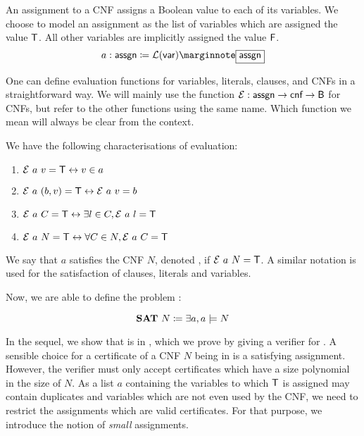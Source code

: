 An assignment to a CNF assigns a Boolean value to each of its variables. We choose to model an assignment as the list of variables which are assigned the value $\mathsf{T}$. All other variables are implicitly assigned the value $\mathsf{F}$.
\[a : \assgn \defeq \listsof{\bvar}\mnote{\assgn} \]

One can define evaluation functions \mnotec{$\eval$} for variables, literals, clauses, and CNFs in a straightforward way. 
We will mainly use the function $\mathcal{E} : \textsf{assgn} \rightarrow \textsf{cnf} \rightarrow \textsf{B}$ for CNFs, but refer to the other functions using the same name. 
Which function we mean will always be clear from the context. 

We have the following characterisations of evaluation:
\begin{lemma}\label{lem:cnf_eval_equiv}\leavevmode
  \begin{enumerate}
    \item $\mathcal{E}~a~v = \mathsf{T} \leftrightarrow v \in a$
    \item $\mathcal{E}~a~(b, v) = \mathsf{T} \leftrightarrow \mathcal{E}~a~v = b$
    \item $\mathcal{E}~a~C = \mathsf{T} \leftrightarrow \exists l \in C, \mathcal{E}~a~l = \mathsf{T}$
    \item $\mathcal{E}~a~N = \mathsf{T} \leftrightarrow \forall C \in N, \mathcal{E}~a~C = \mathsf{T}$
  \end{enumerate}
\end{lemma}

We say that $a$ satisfies the CNF $N$, denoted , if $\mathcal{E}~a~N = \mathsf{T}$. 
A similar notation is used for the satisfaction of clauses, literals and variables.

Now, we are able to define the problem \SAT{}:
\begin{definition}
  \[\textbf{SAT}{}~N \coloneqq \exists a, a \models N \]
\end{definition}

In the sequel, we show that \SAT{} is in \NP{}, which we prove by giving a verifier for \SAT{}. A sensible choice for a certificate of a CNF $N$ being in \SAT{} is a satisfying assignment. However, the verifier must only accept certificates which have a size polynomial in the size of $N$. 
As a list $a$ containing the variables to which $\mathsf{T}$ is assigned may contain duplicates and variables which are not even used by the CNF, we need to restrict the assignments which are valid certificates.
For that purpose, we introduce the notion of \emph{small} assignments. 

